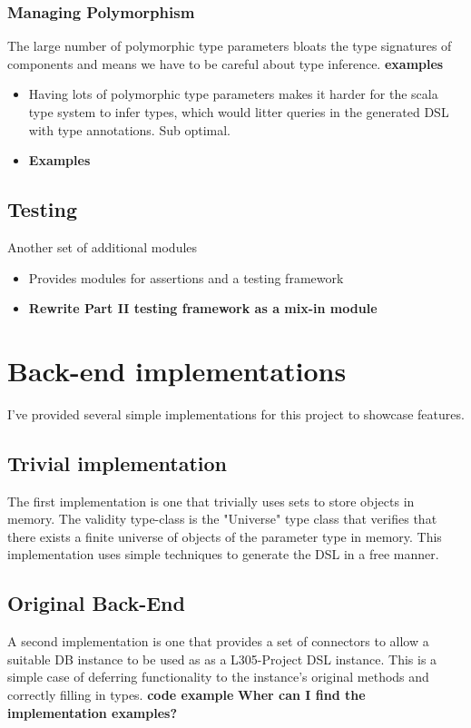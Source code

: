\documentclass{report}
\newcommand \2[0]{\textbf{2}}
\newcommand \3[0]{\textbf{3}}
\newcommand{\todo}[1]{\textbf{#1}}
\begin{document}
\subsection{Managing Polymorphism}
The large number of polymorphic type parameters bloats the type signatures of components and means we have to be careful about type inference. \todo{examples}
\begin{itemize}
    \item Having lots of polymorphic type parameters makes it harder for the scala type system to infer types, which would litter queries in the generated DSL with type annotations. Sub optimal.
    \item\todo{Examples}
\end{itemize}

\section{Testing}
Another set of additional modules
\begin{itemize}
    \item Provides modules for assertions and a testing framework
    \item \todo{Rewrite Part II testing framework as a mix-in module}
\end{itemize}

\chapter{Back-end implementations}

I've provided several simple implementations for this project to showcase features.
\section{Trivial implementation}
The first implementation is one that trivially uses sets  to store objects in memory. The validity type-class is the "Universe" type class that verifies that there exists a finite universe of objects of the parameter type in memory. This implementation uses simple techniques to generate the DSL in a free manner.

\section{Original Back-End}
A second implementation is one that provides a set of connectors to allow a suitable DB instance to be used as as a L305-Project DSL instance. This is a simple case of deferring functionality to the instance's original methods and correctly filling in types. 
\todo{code example}
\todo{Wher can I find the implementation examples?}
\end{document}

